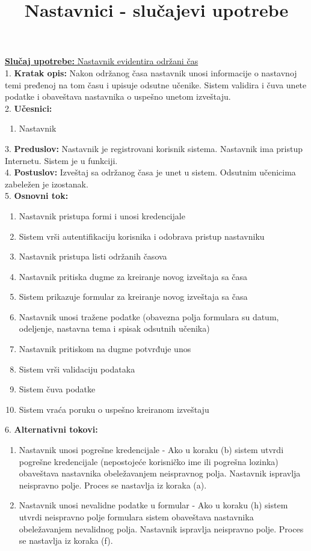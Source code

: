 \documentclass{article}
\title{Nastavnici - slučajevi upotrebe}
\begin{document}
\maketitle

\underline{\textbf{Slučaj upotrebe:} Nastavnik evidentira održani čas} \\

1. \textbf{Kratak opis:} Nakon održanog časa nastavnik unosi informacije o nastavnoj temi pređenoj na tom času i upisuje odsutne učenike. Sistem validira i čuva unete podatke i obaveštava nastavnika o uspešno unetom izveštaju.\\

2. \textbf{Učesnici:}
\begin{enumerate} [label=(\alph*)]
\item Nastavnik
\end{enumerate} 

3. \textbf{Preduslov:} Nastavnik je registrovani korisnik sistema. Nastavnik ima pristup Internetu. Sistem je u funkciji. \\

4. \textbf{Postuslov:} Izveštaj sa održanog časa je unet u sistem. Odsutnim učenicima zabeležen je izostanak. \\

5. \textbf{Osnovni tok:} 
\begin{enumerate} [label=(\alph*)]
\item Nastavnik pristupa formi i unosi kredencijale 
\item Sistem vrši autentifikaciju korisnika i odobrava pristup nastavniku
\item Nastavnik pristupa listi održanih časova
\item Nastavnik pritiska dugme za kreiranje novog izveštaja sa časa
\item Sistem prikazuje formular za kreiranje novog izveštaja sa časa
\item Nastavnik unosi tražene podatke (obavezna polja formulara su datum, odeljenje, nastavna tema i spisak odsutnih učenika)
\item Nastavnik pritiskom na dugme potvrđuje unos
\item Sistem vrši validaciju podataka
\item Sistem čuva podatke
\item Sistem vraća poruku o uspešno kreiranom izveštaju
\end{enumerate}

6. \textbf{Alternativni tokovi:}
\begin{enumerate} [label=(\roman*)]
\item Nastavnik unosi pogrešne kredencijale - Ako u koraku (b) sistem utvrdi pogrešne kredencijale (nepostojeće korisničko ime ili pogrešna lozinka) obaveštava nastavnika obeležavanjem neispravnog polja. Nastavnik ispravlja neispravno polje. Proces se nastavlja iz koraka (a).
\item Nastavnik unosi nevalidne podatke u formular - Ako u koraku (h) sistem utvrdi neispravno polje formulara sistem obaveštava nastavnika obeležavanjem nevalidnog polja. Nastavnik ispravlja neispravno polje. Proces se nastavlja iz koraka (f).
\end{enumerate}
\end{document}
